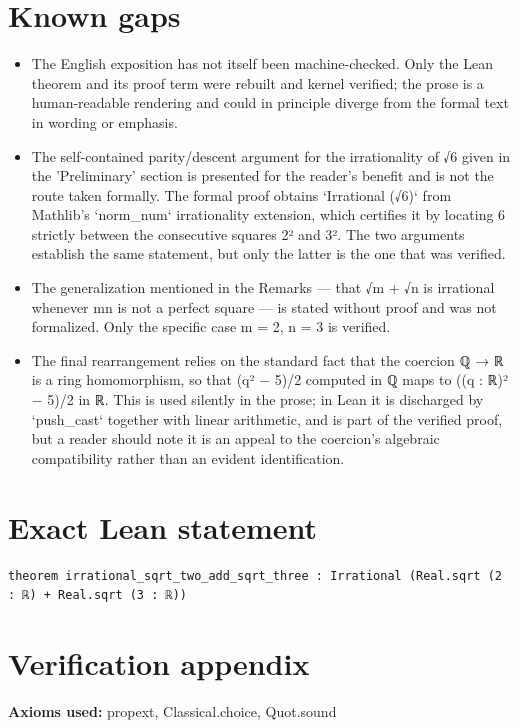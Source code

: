 \documentclass[11pt]{article}
\begin{document}
\section*{Known gaps}
\begin{itemize}
\item The English exposition has not itself been machine-checked. Only the Lean theorem and its proof term were rebuilt and kernel verified; the prose is a human-readable rendering and could in principle diverge from the formal text in wording or emphasis.
\item The self-contained parity/descent argument for the irrationality of √6 given in the 'Preliminary' section is presented for the reader's benefit and is not the route taken formally. The formal proof obtains `Irrational (√6)` from Mathlib's `norm\_num` irrationality extension, which certifies it by locating 6 strictly between the consecutive squares 2² and 3². The two arguments establish the same statement, but only the latter is the one that was verified.
\item The generalization mentioned in the Remarks — that √m + √n is irrational whenever mn is not a perfect square — is stated without proof and was not formalized. Only the specific case m = 2, n = 3 is verified.
\item The final rearrangement relies on the standard fact that the coercion ℚ → ℝ is a ring homomorphism, so that (q² − 5)/2 computed in ℚ maps to ((q : ℝ)² − 5)/2 in ℝ. This is used silently in the prose; in Lean it is discharged by `push\_cast` together with linear arithmetic, and is part of the verified proof, but a reader should note it is an appeal to the coercion's algebraic compatibility rather than an evident identification.
\end{itemize}

\section*{Exact Lean statement}
\begin{Verbatim}[fontsize=\small]
theorem irrational_sqrt_two_add_sqrt_three : Irrational (Real.sqrt (2 : ℝ) + Real.sqrt (3 : ℝ))
\end{Verbatim}

\section*{Verification appendix}
\textbf{Axioms used:} propext, Classical.choice, Quot.sound
\end{document}
